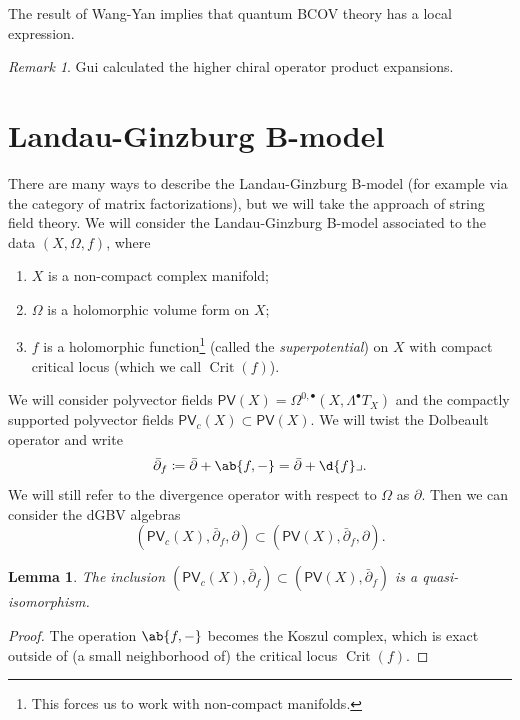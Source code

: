 \documentclass{amsart}
\newtheorem{lem}[thm]{Lemma}
\theoremstyle{definition}
\theoremstyle{remark}
\newtheorem{rmk}[thm]{Remark}
\theoremstyle{plain}
\theoremstyle{definition}
\theoremstyle{remark}
\newcommand{\on}[1]{\operatorname{#1}}
\newcommand{\ms}[1]{\mathsf{#1}}
\newcommand{\1}{\mathbf{1}}
\newcommand{\2}{\mathbf{2}}
\newcommand{\3}{\mathbf{3}}
\newcommand{\dbar}{\bar{\partial}}
\DeclareMathOperator{\Crit}{Crit}
\begin{document}
The result of Wang-Yan implies that quantum BCOV theory has a local expression.

\begin{rmk}
    Gui calculated the higher chiral operator product expansions.
\end{rmk}



\section{Landau-Ginzburg B-model}%
\label{sec:Landau-Ginzburg B-model}

There are many ways to describe the Landau-Ginzburg B-model (for example via the category of matrix factorizations), but we will take the approach of string field theory. We will consider the Landau-Ginzburg B-model associated to the data \((X, \Omega, f)\), where
\begin{enumerate}
    \item \(X\) is a non-compact complex manifold;
    \item \(\Omega\) is a holomorphic volume form on \(X\);
    \item \(f\) is a holomorphic function\footnote{This forces us to work with non-compact manifolds.} (called the \textit{superpotential}) on \(X\) with compact critical locus (which we call \(\on{Crit}(f)\)).
\end{enumerate}

We will consider polyvector fields \(\ms{PV}(X) = \Omega^{0, \bullet}(X, \Lambda^{\bullet} T_X)\) and the compactly supported polyvector fields \(\ms{PV}_c(X) \subset \ms{PV}(X)\). We will twist the Dolbeault operator and write
\[ \dbar_f \coloneqq \dbar + \ab\{f, -\} = \dbar + \d{f} \lrcorner. \]
We will still refer to the divergence operator with respect to \(\Omega\) as \(\partial\). Then we can consider the dGBV algebras
\[ (\ms{PV}_c(X), \dbar_f, \partial) \subset (\ms{PV}(X), \dbar_f, \partial). \]

\begin{lem}
    The inclusion \((\ms{PV}_c(X), \dbar_f) \subset (\ms{PV}(X), \dbar_f)\) is a quasi-isomorphism.
\end{lem}

\begin{proof}
    The operation \(\ab\{f, -\}\) becomes the Koszul complex, which is exact outside of (a small neighborhood of) the critical locus \(\Crit(f)\).
\end{proof}
\end{document}
